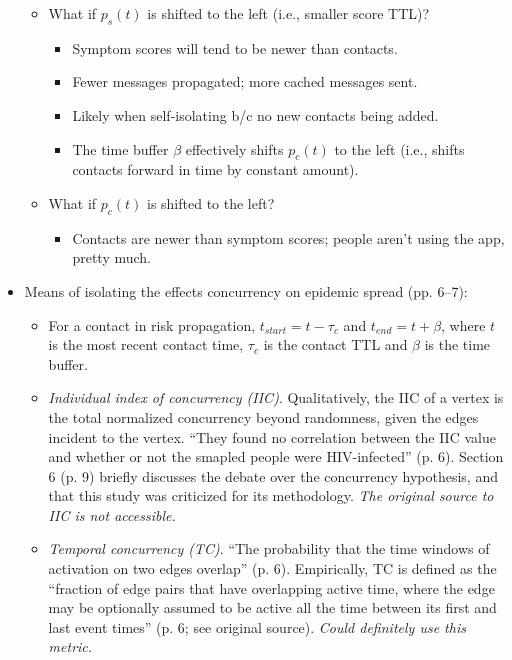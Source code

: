 \begin{itemize}
{\begin{itemize}
\begin{itemize}
				\item Actual TTL doesn't matter.
			\end{itemize}
		\item What if $p_s(t)$ is shifted to the left (i.e., smaller score TTL)?
			\begin{itemize}
				\item Symptom scores will tend to be newer than contacts.
				\item Fewer messages propagated; more cached messages sent.
				\item Likely when self-isolating b/c no new contacts being added.
				\item The time buffer $\beta$ effectively shifts $p_c(t)$ to the left (i.e., shifts contacts forward in time by constant amount).
			\end{itemize}
		\item What if $p_c(t)$ is shifted to the left?
			\begin{itemize}
				\item Contacts are newer than symptom scores; people aren't using the app, pretty much.
			\end{itemize}
	\end{itemize}}
\item Means of isolating the effects concurrency on epidemic spread (pp. 6--7):
	\begin{itemize}
		\item For a contact in risk propagation, $t_{\mathit{start}} = t - \tau_c$ and $t_{\mathit{end}} = t + \beta$, where $t$ is the most recent contact time, $\tau_c$ is the contact TTL and $\beta$ is the time buffer.
		\item \emph{Individual index of concurrency (IIC)}. Qualitatively, the IIC of a vertex is the total normalized concurrency beyond randomness, given the edges incident to the vertex. ``They found no correlation between the IIC value and whether or not the smapled people were HIV-infected'' (p. 6). Section 6 (p. 9) briefly discusses the debate over the concurrency hypothesis, and that this study was criticized for its methodology. \emph{The original source to IIC is not accessible.}
		\item \emph{Temporal concurrency (TC)}. ``The probability that the time windows of activation on two edges overlap'' (p. 6). Empirically, TC is defined as the ``fraction of edge pairs that have overlapping active time, where the edge may be optionally assumed to be active all the time between its first and last event times'' (p. 6; see original source). \emph{Could definitely use this metric.}

\end{itemize}
\end{itemize}
